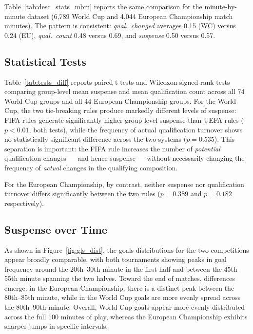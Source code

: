 \documentclass[11pt]{article}
\begin{document}
Table~\ref{tab:desc_stats_mbm} reports the same comparison for the minute-by-minute dataset (6{,}789 World Cup and 4{,}044 European Championship match minutes). The pattern is consistent: \textit{qual.\ changed} averages 0.15 (WC) versus 0.24 (EU), \textit{qual.\ count} 0.48 versus 0.69, and \textit{suspense} 0.50 versus 0.57.





\subsection{Statistical Tests}

Table~\ref{tab:tests_diff} reports paired t-tests and Wilcoxon signed-rank tests comparing group-level mean suspense and mean qualification count across all 74 World Cup groups and all 44 European Championship groups. For the World Cup, the two tie-breaking rules produce markedly different levels of suspense: FIFA rules generate significantly higher group-level suspense than UEFA rules ($p<0.01$, both tests), while the frequency of actual qualification turnover shows no statistically significant difference across the two systems ($p=0.535$). This separation is important: the FIFA rule increases the number of \textit{potential} qualification changes — and hence suspense — without necessarily changing the frequency of \textit{actual} changes in the qualifying composition.

For the European Championship, by contrast, neither suspense nor qualification turnover differs significantly between the two rules ($p=0.389$ and $p=0.182$ respectively). 





\subsection{Suspense over Time}


As shown in Figure~\ref{fig:gls_dist}, the goals distributions for the two competitions appear broadly comparable, with both tournaments showing peaks in goal frequency around the 20th–30th minute in the first half and between the 45th–55th minute spanning the two halves. Toward the end of matches, differences emerge: in the European Championship, there is a distinct peak between the 80th–85th minute, while in the World Cup goals are more evenly spread across the 80th–90th minute. Overall, World Cup goals appear more evenly distributed across the full 100 minutes of play, whereas the European Championship exhibits sharper jumps in specific intervals.
\end{document}
